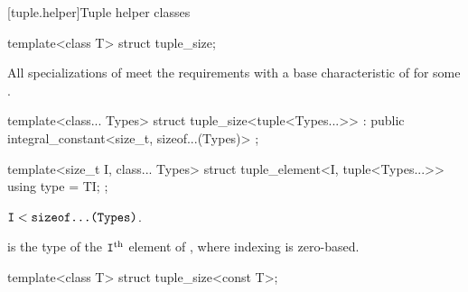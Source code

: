 [tuple.helper]{Tuple helper classes}

%
\begin{itemdecl}
template<class T> struct tuple_size;
\end{itemdecl}

\begin{itemdescr}
\pnum
All specializations of  meet the
 requirements with a
base characteristic of 
for some .
\end{itemdescr}

%
\begin{itemdecl}
template<class... Types>
  struct tuple_size<tuple<Types...>> : public integral_constant<size_t, sizeof...(Types)> { };
\end{itemdecl}

%
\begin{itemdecl}
template<size_t I, class... Types>
  struct tuple_element<I, tuple<Types...>> {
    using type = TI;
  };
\end{itemdecl}

\begin{itemdescr}
\pnum
\mandates
$\texttt{I} < \texttt{sizeof...(Types)}$.

\pnum
\ctype
{} is the
type of the $\texttt{I}^\text{th}$ element of ,
where indexing is zero-based.
\end{itemdescr}

%
\begin{itemdecl}
template<class T> struct tuple_size<const T>;
\end{itemdecl}

